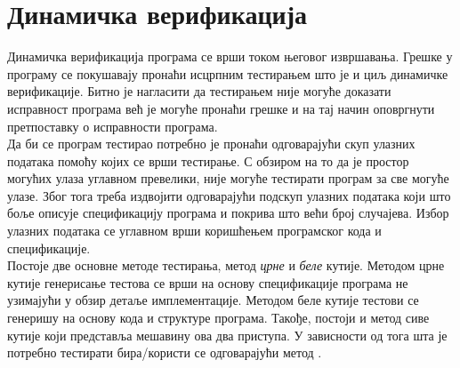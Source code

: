 \documentclass[12pt,oneside]{memoir}
\begin{document}
  \section{Динамичка верификација}
  Динамичка верификација програма се врши током његовог извршавања. Грешке у програму се покушавају пронаћи исцрпним тестирањем што је и циљ динамичке верификације. Битно је нагласити да тестирањем није могуће доказати исправност програма већ је могуће пронаћи грешке и на тај начин оповргнути претпоставку о исправности програма. 
  \\ \indent Да би се програм тестирао потребно је пронаћи одговарајући скуп улазних података помоћу којих се врши тестирање.  С обзиром на то да је простор могућих улаза углавном превелики, није могуће тестирати програм за све могуће улазе. Због тога треба издвојити одговарајући подскуп улазних података који што боље описује спецификацију програма и покрива што већи број случајева. Избор улазних података се углавном врши коришћењем програмског кода и спецификације. 
  \\ \indent Постоје две основне методе тестирања, метод \emph{црне} и 
 \emph{беле} кутије.  Методом црне кутије генерисање тестова се врши на основу спецификације програма не узимајући у обзир детаље имплементације. Методом беле кутије тестови се генеришу на основу кода и структуре програма. Такође, постоји и метод сиве кутије који представља мешавину ова два приступа. У зависности од тога шта је потребно тестирати бира/користи се одговарајући метод \cite{testing}. 
  
  
\end{document}
